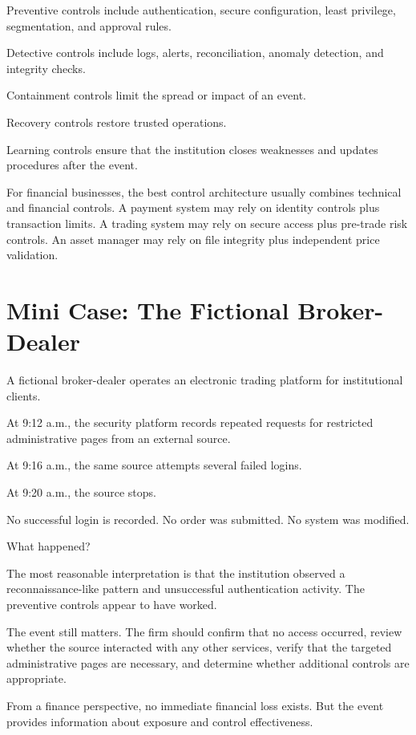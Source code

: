 Preventive controls include authentication, secure configuration, least privilege, segmentation, and approval rules.

Detective controls include logs, alerts, reconciliation, anomaly detection, and integrity checks.

Containment controls limit the spread or impact of an event.

Recovery controls restore trusted operations.

Learning controls ensure that the institution closes weaknesses and updates procedures after the event.

For financial businesses, the best control architecture usually combines technical and financial controls. A payment system may rely on identity controls plus transaction limits. A trading system may rely on secure access plus pre-trade risk controls. An asset manager may rely on file integrity plus independent price validation.

\section{Mini Case: The Fictional Broker-Dealer}

A fictional broker-dealer operates an electronic trading platform for institutional clients.

At 9:12 a.m., the security platform records repeated requests for restricted administrative pages from an external source.

At 9:16 a.m., the same source attempts several failed logins.

At 9:20 a.m., the source stops.

No successful login is recorded. No order was submitted. No system was modified.

What happened?

The most reasonable interpretation is that the institution observed a reconnaissance-like pattern and unsuccessful authentication activity. The preventive controls appear to have worked.

The event still matters. The firm should confirm that no access occurred, review whether the source interacted with any other services, verify that the targeted administrative pages are necessary, and determine whether additional controls are appropriate.

From a finance perspective, no immediate financial loss exists. But the event provides information about exposure and control effectiveness.

